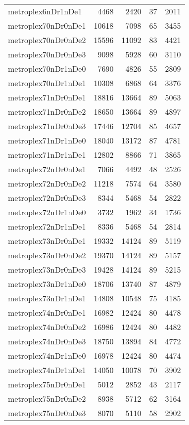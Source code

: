 \begin{tabular}{lrrrr}
metroplex6nDr1nDe1 & 4468 & 2420 & 37 & 2011 \\
metroplex70nDr0nDe1 & 10618 & 7098 & 65 & 3455 \\
metroplex70nDr0nDe2 & 15596 & 11092 & 83 & 4421 \\
metroplex70nDr0nDe3 & 9098 & 5928 & 60 & 3110 \\
metroplex70nDr1nDe0 & 7690 & 4826 & 55 & 2809 \\
metroplex70nDr1nDe1 & 10308 & 6868 & 64 & 3376 \\
metroplex71nDr0nDe1 & 18816 & 13664 & 89 & 5063 \\
metroplex71nDr0nDe2 & 18650 & 13664 & 89 & 4897 \\
metroplex71nDr0nDe3 & 17446 & 12704 & 85 & 4657 \\
metroplex71nDr1nDe0 & 18040 & 13172 & 87 & 4781 \\
metroplex71nDr1nDe1 & 12802 & 8866 & 71 & 3865 \\
metroplex72nDr0nDe1 & 7066 & 4492 & 48 & 2526 \\
metroplex72nDr0nDe2 & 11218 & 7574 & 64 & 3580 \\
metroplex72nDr0nDe3 & 8344 & 5468 & 54 & 2822 \\
metroplex72nDr1nDe0 & 3732 & 1962 & 34 & 1736 \\
metroplex72nDr1nDe1 & 8336 & 5468 & 54 & 2814 \\
metroplex73nDr0nDe1 & 19332 & 14124 & 89 & 5119 \\
metroplex73nDr0nDe2 & 19370 & 14124 & 89 & 5157 \\
metroplex73nDr0nDe3 & 19428 & 14124 & 89 & 5215 \\
metroplex73nDr1nDe0 & 18706 & 13740 & 87 & 4879 \\
metroplex73nDr1nDe1 & 14808 & 10548 & 75 & 4185 \\
metroplex74nDr0nDe1 & 16982 & 12424 & 80 & 4478 \\
metroplex74nDr0nDe2 & 16986 & 12424 & 80 & 4482 \\
metroplex74nDr0nDe3 & 18750 & 13894 & 84 & 4772 \\
metroplex74nDr1nDe0 & 16978 & 12424 & 80 & 4474 \\
metroplex74nDr1nDe1 & 14050 & 10078 & 70 & 3902 \\
metroplex75nDr0nDe1 & 5012 & 2852 & 43 & 2117 \\
metroplex75nDr0nDe2 & 8938 & 5712 & 62 & 3164 \\
metroplex75nDr0nDe3 & 8070 & 5110 & 58 & 2902 \\

\end{tabular}
